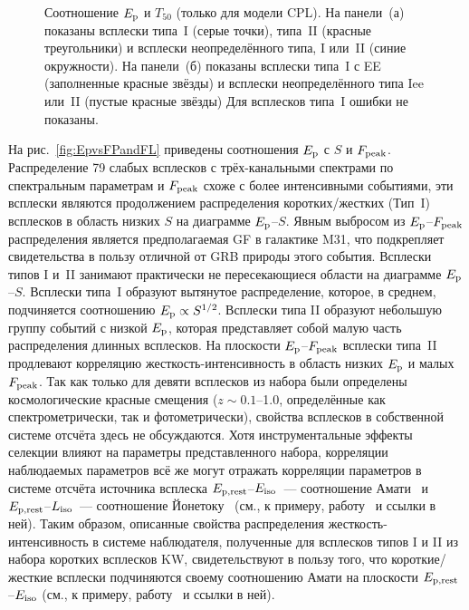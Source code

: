 \begin{figure}
    \begin{minipage}[h]{0.5\textwidth}
    \end{minipage}
    \hfill
    \begin{minipage}[h]{0.5\textwidth}
	\end{minipage}

\caption{
    Соотношение $E_{\mathrm{p}}$ и $T_{50}$ (только для модели CPL).
    На панели~(а) показаны всплески типа~I (серые точки), типа~II (красные треугольники)
    и всплески неопределённого типа, I или~II (синие окружности).
    На панели~(б) показаны всплески типа~I с EE (заполненные красные звёзды)
    и всплески неопределённого типа Iee или~II (пустые красные звёзды)
    Для всплесков типа~I ошибки не показаны. 
    \label{fig:EpT50}}
\end{figure}

На рис.~\ref{fig:EpvsFPandFL} приведены соотношения $E_{\mathrm{p}}$ с $S$ и $F_{\mathrm{peak}}$.
Распределение 79 слабых всплесков с трёх-канальными спектрами по спектральным параметрам 
и $F_{\mathrm{peak}}$ схоже с более интенсивными событиями, эти всплески являются продолжением
распределения коротких/жестких (Тип~I) всплесков в область низких $S$  на диаграмме $E_{\mathrm{p}}$--$S$.
Явным выбросом из  $E_{\mathrm{p}}$--$F_{\mathrm{peak}}$ распределения является предполагаемая 
GF в галактике M31, что подкрепляет свидетельства в пользу отличной от GRB природы этого события.
Всплески типов I и~II занимают практически не пересекающиеся области на диаграмме $E_{\mathrm{p}}$--$S$.
Всплески типа~I образуют вытянутое распределение, которое, в среднем, подчиняется 
соотношению $E_{\mathrm{p}} \propto S^{1/2}$. Всплески типа II образуют небольшую группу событий
с низкой $E_{\mathrm{p}}$, которая представляет собой малую часть распределения длинных всплесков.
На плоскости $E_{\mathrm{p}}$--$F_{\mathrm{peak}}$ всплески типа~II продлевают корреляцию 
жесткость-интенсивность в область низких $E_{\mathrm{p}}$ и малых $F_{\mathrm{peak}}$.
Так как только для девяти всплесков из набора были определены космологические 
красные смещения ($z\sim 0.1$--1.0, определённые как спектрометрически, так и
фотометрически), свойства всплесков в собственной системе отсчёта здесь не обсуждаются.
Хотя инструментальные эффекты селекции влияют на параметры представленного набора,
корреляции наблюдаемых параметров всё же могут отражать корреляции параметров 
в системе отсчёта источника всплеска $E_{\mathrm{p,rest}}$--$E_{\mathrm{iso}}$~--- 
соотношение Амати~\citep{Amati_2002AandA} и $E_{\mathrm{p,rest}}$--$L_{\mathrm{iso}}$~--- 
соотношение Йонетоку~\citep{Yonetoku_2004ApJ}
(см., к примеру, работу~\citep{Nava_2008MNRAS} и ссылки в ней).
Таким образом, описанные свойства распределения жесткость-интенсивность 
в системе наблюдателя, полученные для всплесков типов I и II из набора коротких 
всплесков KW, свидетельствуют в пользу того, что короткие/жесткие всплески подчиняются 
своему соотношению Амати на плоскости $E_{\mathrm{p,rest}}$--$E_{\mathrm{iso}}$
(см., к примеру, работу~\citep{Nava_2011MNRAS} и ссылки в ней).

